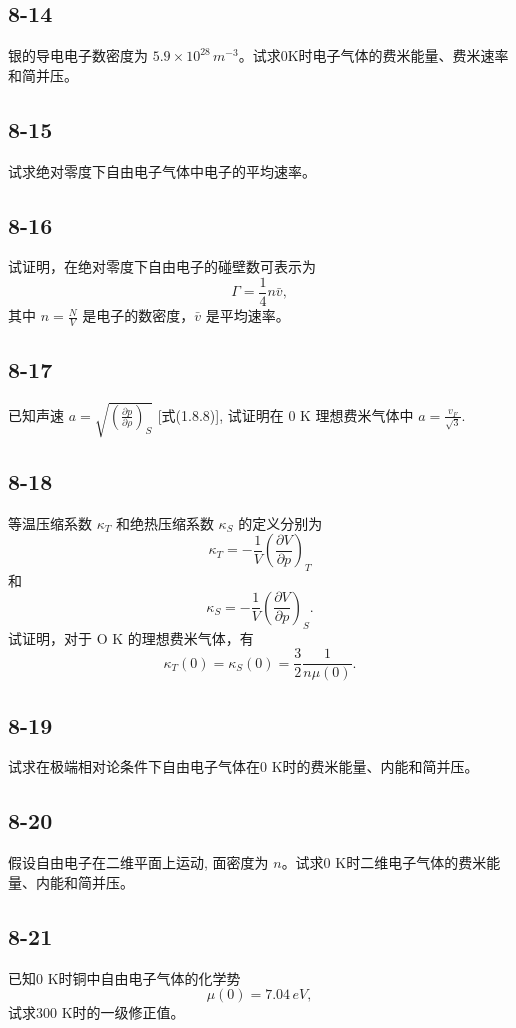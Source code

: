 \newpage
\subsection{8-14}
银的导电电子数密度为 $ 5.9 \times 10^{28} \, m^{-3} $。试求0K时电子气体的费米能量、费米速率和简并压。

\newpage
\subsection{8-15}
试求绝对零度下自由电子气体中电子的平均速率。

\newpage
\subsection{8-16}
试证明，在绝对零度下自由电子的碰壁数可表示为
$$ \Gamma = \frac{1}{4} n\bar{v}, $$
其中 $ n = \frac{N}{V} $ 是电子的数密度，$ \bar{v} $ 是平均速率。

\newpage
\subsection{8-17}
已知声速 $ a = \sqrt{\left( \frac{\partial p}{\partial \rho} \right)_S} $ [式(1.8.8)], 试证明在 0 K 理想费米气体中 $ a = \frac{v_F}{\sqrt{3}} $.

\newpage
\subsection{8-18}
等温压缩系数 $\kappa_T$ 和绝热压缩系数 $\kappa_S$ 的定义分别为
$$ \kappa_T = -\frac{1}{V} \left( \frac{\partial V}{\partial p} \right)_T $$
和
$$ \kappa_S = -\frac{1}{V} \left( \frac{\partial V}{\partial p} \right)_S. $$
试证明，对于 O K 的理想费米气体，有
$$ \kappa_T (0) = \kappa_S (0) = \frac{3}{2} \frac{1}{n\mu (0)}. $$

\newpage
\subsection{8-19}
试求在极端相对论条件下自由电子气体在0 K时的费米能量、内能和简并压。

\newpage
\subsection{8-20}
假设自由电子在二维平面上运动, 面密度为 $ n $。试求0 K时二维电子气体的费米能量、内能和简并压。

\newpage
\subsection{8-21}
已知0 K时铜中自由电子气体的化学势
$$ \mu (0) = 7.04 \, eV, $$
试求300 K时的一级修正值。

